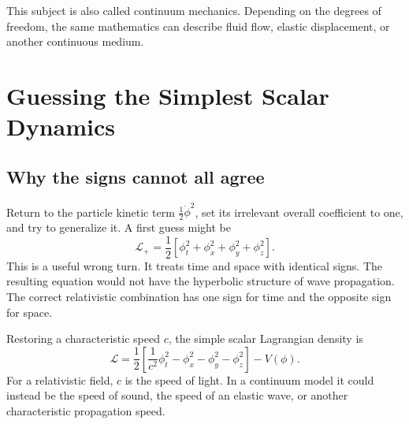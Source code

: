 This subject is also called continuum mechanics.  Depending on the degrees of
freedom, the same mathematics can describe fluid flow, elastic displacement,
or another continuous medium.

\begin{classroomqa}
\end{classroomqa}

\section{Guessing the Simplest Scalar Dynamics}

\subsection{Why the signs cannot all agree}

Return to the particle kinetic term \(\tfrac12\dot\phi^2\), set its irrelevant
overall coefficient to one, and try to generalize it.  A first guess might be
\begin{equation}
\mathcal{L}_{+}
=
\frac12
\left[
\phi_t^2+\phi_x^2+\phi_y^2+\phi_z^2
\right].
\label{eq:sr4-all-plus}
\end{equation}
This is a useful wrong turn.  It treats time and space with identical signs.
The resulting equation would not have the hyperbolic structure of wave
propagation.  The correct relativistic combination has one sign for time and
the opposite sign for space.

\begin{classroomqa}
\end{classroomqa}

Restoring a characteristic speed \(c\), the simple scalar Lagrangian density is
\begin{equation}
\boxed{
\mathcal{L}
=
\frac12
\left[
\frac{1}{c^2}\phi_t^2
-\phi_x^2-\phi_y^2-\phi_z^2
\right]
-V(\phi)
}.
\label{eq:sr4-scalar-lagrangian}
\end{equation}
For a relativistic field, \(c\) is the speed of light.  In a continuum model it
could instead be the speed of sound, the speed of an elastic wave, or another
characteristic propagation speed.

